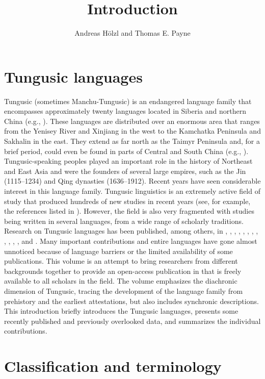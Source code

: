 \documentclass[output=paper,colorlinks,citecolor=brown]{langscibook}
\title{Introduction}
\author{Andreas Hölzl\affiliation{University of Potsdam} and Thomas E. Payne\affiliation{University of Oregon}}
\begin{document}
\maketitle

\section{Tungusic languages}

Tungusic (sometimes Manchu-Tungusic) is an endangered language family that encompasses approximately twenty languages located in Siberia and northern China (e.g., \citealt{Janhunen1996, Janhunen2005, Janhunen2012a}). These languages are distributed over an enormous area that ranges from the Yenisey River and Xinjiang in the west to the Kamchatka Peninsula and Sakhalin in the east. They extend as far north as the Taimyr Peninsula and, for a brief period, could even be found in parts of Central and South China (e.g., \citealt{HölzlHölzl2019b}). Tungusic-speaking peoples played an important role in the history of Northeast and East Asia and were the founders of several large empires, such as the Jin (1115--1234) and Qing dynasties (1636--1912). Recent years have seen considerable interest in this language family. Tungusic linguistics is an extremely active field of study that produced hundreds of new studies in recent years (see, for example, the references listed in \citealt{Hölzl2021b}). However, the field is also very fragmented with studies being written in several languages, from a wide range of scholarly traditions. Research on Tungusic languages has been published, among others, in , , , , , , , , , , , , and . Many important contributions and entire languages have gone almost unnoticed because of language barriers or the limited availability of some publications. This volume is an attempt to bring researchers from different backgrounds together to provide an open-access publication in  that is freely available to all scholars in the field. The volume emphasizes the diachronic dimension of Tungusic, tracing the development of the language family from prehistory and the earliest attestations, but also includes synchronic descriptions. This introduction briefly introduces the Tungusic languages, presents some recently published and previously overlooked data, and summarizes the individual contributions.


\section{Classification and terminology}
\end{document}
